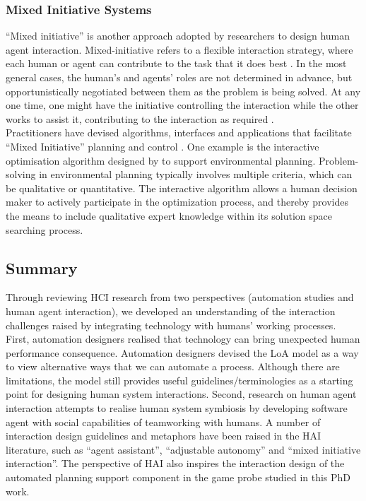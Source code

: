 \subsubsection{Mixed Initiative Systems}
``Mixed initiative'' is another approach adopted by researchers to design human agent interaction.  Mixed-initiative refers to a flexible interaction strategy, where each human or agent can contribute to the task that it does best \citep{Allen1999}. In the most general cases, the human's and agents' roles are not determined in advance, but opportunistically negotiated between them as the problem is being solved. At any one time, one might have the initiative controlling the interaction while the other works to assist it, contributing to the interaction as required \citep{Horvitz1999}.\\

Practitioners have devised algorithms, interfaces and applications that facilitate ``Mixed Initiative'' planning and control \citep{Ferguson1996,Burstein2003,Hardin2009,Zimmerman2007}. One example is the interactive optimisation algorithm designed by \citep{Yang2012} to support environmental planning. Problem-solving in environmental planning typically involves multiple criteria, which can be qualitative or quantitative. The interactive algorithm allows a human decision maker to actively participate in the optimization process, and thereby provides the means to include qualitative expert knowledge within its solution space searching process.\\


\subsection{Summary}
Through reviewing \ac{HCI} research from two perspectives (automation studies and human agent interaction), we developed an understanding of the interaction challenges raised by integrating technology with humans' working processes. First, automation designers realised that technology can bring unexpected human performance consequence. Automation designers devised the \ac{LoA} model as a way to view alternative ways that we can automate a process. Although there are limitations, the model still provides useful guidelines/terminologies as a starting point for designing human system interactions. Second, research on human agent interaction attempts to realise human system symbiosis by developing software agent with social capabilities of teamworking with humans. A number of interaction design guidelines and metaphors have been raised in the \ac{HAI} literature, such as ``agent assistant'', ``adjustable autonomy'' and ``mixed initiative interaction''. The perspective of \ac{HAI} also inspires the interaction design of the automated planning support component in the game probe studied in this PhD work.\\ 

